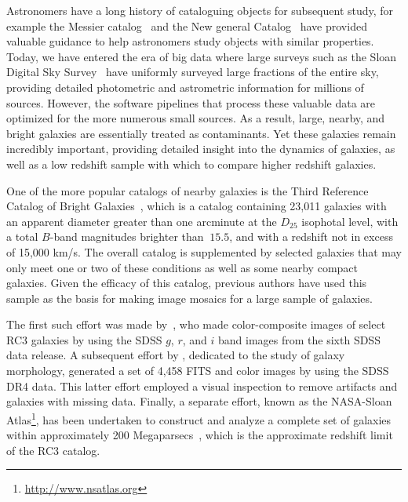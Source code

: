 \documentclass[authoryear, 12pt, 5p, times]{elsarticle}
\begin{document}
Astronomers have a long history of cataloguing objects for subsequent study, for example the Messier catalog~\citep{messcat} and the New general Catalog~\citep[NGC;][]{ngccat} have provided valuable guidance to help astronomers study objects with similar properties. Today, we have entered the era of big data where large surveys such as the Sloan Digital Sky Survey~\citep[SDSS;][]{sdsstech} have uniformly surveyed large fractions of the entire sky, providing detailed photometric and astrometric information for millions of sources. However, the software pipelines that  process these valuable data are optimized for the more numerous small sources. As a result, large, nearby, and bright galaxies are essentially treated as contaminants. Yet these galaxies remain incredibly important, providing detailed insight into the dynamics of galaxies,
 as well as a low redshift sample with which to compare higher redshift galaxies. 

One of the more popular catalogs of nearby galaxies is the Third Reference Catalog of Bright Galaxies~\citep[RC3;][]{rc31991}, which is a catalog containing 23,011 galaxies with an apparent diameter greater than one arcminute at the $D_{25}$ isophotal level, with a total $B$-band magnitudes brighter than $~15.5$, and with a redshift not in excess of 15,000 km/s. The overall catalog is supplemented by selected galaxies that may only meet one or two of these conditions as well as some  nearby compact galaxies. Given the efficacy of this catalog, previous authors have used this sample as the basis for making image mosaics for a large sample of galaxies. 

The first such effort was made by~\cite{hbrc3}, who made color-composite images of select RC3 galaxies by using the SDSS $g$, $r$, and $i$ band images from the sixth SDSS data release. A subsequent effort by \citet{efigi}, dedicated to the study of galaxy morphology, generated a set of 4,458 FITS and color images by using the SDSS DR4 data. This latter effort employed a visual inspection to remove artifacts and galaxies with missing data. Finally, a separate effort, known as the NASA-Sloan Atlas\footnote{\url{http://www.nsatlas.org}}, has been undertaken to construct and analyze a complete set of galaxies within approximately 200 Megaparsecs~\citep{nsa}, which is the approximate redshift limit of the RC3 catalog.
\end{document}

